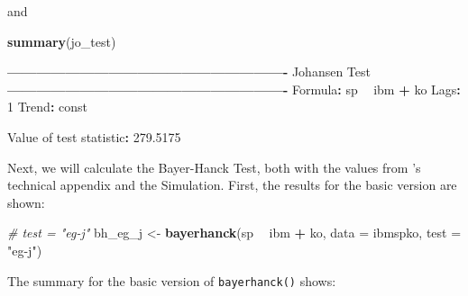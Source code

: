 \documentclass[12pt,a4paper]{article}
\newenvironment{Shaded}{\begin{snugshade}}{\end{snugshade}}
\newcommand{\CommentTok}[1]{\textcolor[rgb]{0.56,0.35,0.01}{\textit{#1}}}
\newcommand{\DataTypeTok}[1]{\textcolor[rgb]{0.13,0.29,0.53}{#1}}
\newcommand{\DecValTok}[1]{\textcolor[rgb]{0.00,0.00,0.81}{#1}}
\newcommand{\FloatTok}[1]{\textcolor[rgb]{0.00,0.00,0.81}{#1}}
\newcommand{\KeywordTok}[1]{\textcolor[rgb]{0.13,0.29,0.53}{\textbf{#1}}}
\newcommand{\NormalTok}[1]{#1}
\newcommand{\OperatorTok}[1]{\textcolor[rgb]{0.81,0.36,0.00}{\textbf{#1}}}
\newcommand{\StringTok}[1]{\textcolor[rgb]{0.31,0.60,0.02}{#1}}
\begin{document}
and

\begin{Shaded}
\begin{Highlighting}[]
\KeywordTok{summary}\NormalTok{(jo_test)}

\OperatorTok{----------------------------------------------------------}
\NormalTok{Johansen Test}
\OperatorTok{----------------------------------------------------------}
\NormalTok{Formula}\OperatorTok{:}\StringTok{ }\NormalTok{sp }\OperatorTok{~}\StringTok{ }\NormalTok{ibm }\OperatorTok{+}\StringTok{ }\NormalTok{ko}
\NormalTok{Lags}\OperatorTok{:}\StringTok{ }\DecValTok{1}
\NormalTok{Trend}\OperatorTok{:}\StringTok{ }\NormalTok{const}
 
\NormalTok{Value of test statistic}\OperatorTok{:}\StringTok{ }\FloatTok{279.5175}
\end{Highlighting}
\end{Shaded}

Next, we will calculate the Bayer-Hanck Test, both with the values from
\textcite{Bayerhanck2009}'s technical appendix and the Simulation.
First, the results for the basic version are shown:

\begin{Shaded}
\begin{Highlighting}[]
\CommentTok{# test = "eg-j"}
\NormalTok{bh_eg_j <-}\StringTok{ }\KeywordTok{bayerhanck}\NormalTok{(sp }\OperatorTok{~}\StringTok{ }\NormalTok{ibm  }\OperatorTok{+}\StringTok{ }\NormalTok{ko, }\DataTypeTok{data =}\NormalTok{ ibmspko,}
                      \DataTypeTok{test =} \StringTok{"eg-j"}\NormalTok{)}
\end{Highlighting}
\end{Shaded}

The summary for the basic version of \texttt{bayerhanck()} shows:
\end{document}
